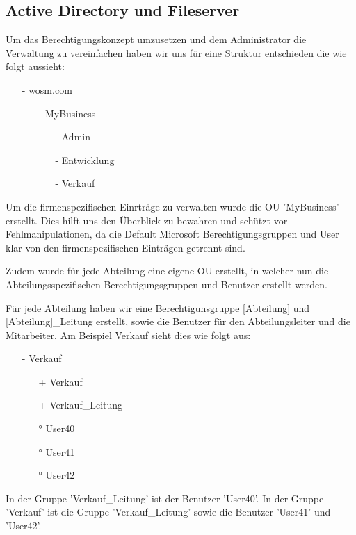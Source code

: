 \documentclass[11pt,a4paper,parskip=half]{scrartcl}
\begin{document}
\subsection{Active Directory und Fileserver}
Um das Berechtigungskonzept umzusetzen und dem Administrator die Verwaltung zu vereinfachen haben wir uns für eine Struktur entschieden die wie folgt aussieht:
\begin{itemize}
\item[-]{wosm.com}
\begin{itemize}
\item[-]{MyBusiness}
\begin{itemize}
\item[-]{Admin}
\item[-]{Entwicklung}
\item[-]{Verkauf}
\end{itemize}
\end{itemize}
\end{itemize}
Um die firmenspezifischen Einrträge zu verwalten wurde die OU 'MyBusiness' erstellt. Dies hilft uns den Überblick zu bewahren und schützt vor Fehlmanipulationen, da die Default Microsoft Berechtigungsgruppen und User klar von den firmenspezifischen Einträgen getrennt sind.

Zudem wurde für jede Abteilung eine eigene OU erstellt, in welcher nun die Abteilungsspezifischen Berechtigungsgruppen und Benutzer erstellt werden.

Für jede Abteilung haben wir eine Berechtigunsgruppe [Abteilung] und [Abteilung]\_Leitung erstellt, sowie die Benutzer für den Abteilungsleiter und die Mitarbeiter. Am Beispiel Verkauf sieht dies wie folgt aus:
\begin{itemize}
\item[-]{Verkauf}
\begin{itemize}
\item[+]{Verkauf}
\item[+]{Verkauf\_Leitung}
\item[°]{User40}
\item[°]{User41}
\item[°]{User42}
\end{itemize}
\end{itemize}
In der Gruppe 'Verkauf\_Leitung' ist der Benutzer 'User40'. In der Gruppe 'Verkauf' ist die Gruppe 'Verkauf\_Leitung' sowie die Benutzer 'User41' und 'User42'.
\end{document}
